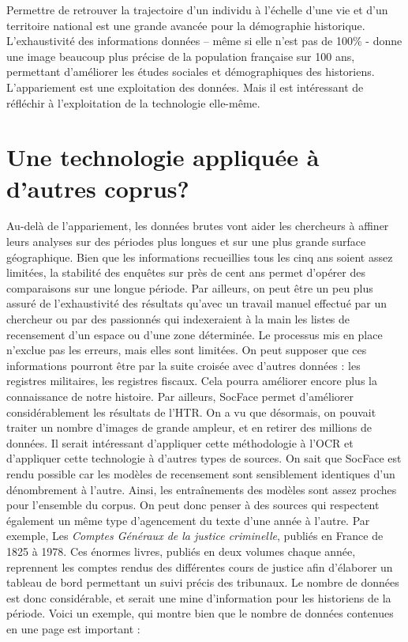 Permettre de retrouver la trajectoire d’un individu à l’échelle d’une vie et d’un territoire national est une grande avancée pour la démographie historique. L’exhaustivité des informations données – même si elle n’est pas de 100\% - donne une image beaucoup plus précise de la population française sur 100 ans, permettant d’améliorer les études sociales et démographiques des historiens.\\

L’appariement est une exploitation des données. Mais il est intéressant de réfléchir à l’exploitation de la technologie elle-même. 

    \section{Une technologie appliquée à d'autres coprus?}

Au-delà de l’appariement, les données brutes vont aider les chercheurs à affiner leurs analyses sur des périodes plus longues et sur une plus grande surface géographique. Bien que les informations recueillies tous les cinq ans soient assez limitées, la stabilité des enquêtes sur près de cent ans permet d’opérer des comparaisons sur une longue période. Par ailleurs, on peut être un peu plus assuré de l’exhaustivité des résultats qu’avec un travail manuel effectué par un chercheur ou par des passionnés qui indexeraient à la main les listes de recensement d’un espace ou d’une zone déterminée. Le processus mis en place n’exclue pas les erreurs, mais elles sont limitées. On peut supposer que ces informations pourront être par la suite croisée avec d’autres données : les registres militaires, les registres fiscaux. Cela pourra améliorer encore plus la connaissance de notre histoire.
Par ailleurs, SocFace permet d’améliorer considérablement les résultats de l’HTR. On a vu que désormais, on pouvait traiter un nombre d’images de grande ampleur, et en retirer des millions de données. Il serait intéressant d’appliquer cette méthodologie à l’OCR et d’appliquer cette technologie à d’autres types de sources. On sait que SocFace est rendu possible car les modèles de recensement sont sensiblement identiques d’un dénombrement à l’autre. Ainsi, les entraînements des modèles sont assez proches pour l’ensemble du corpus. On peut donc penser à des sources qui respectent également un même type d’agencement du texte d’une année à l’autre. Par exemple, Les \textit{Comptes Généraux de la justice criminelle}, publiés en France de 1825 à 1978. Ces énormes livres, publiés en deux volumes chaque année, reprennent les comptes rendus des différentes cours de justice afin d’élaborer un tableau de bord permettant un suivi précis des tribunaux. Le nombre de données est donc considérable, et serait une mine d’information pour les historiens de la période. 
Voici un exemple, qui montre bien que le nombre de données contenues en une page est important : 

